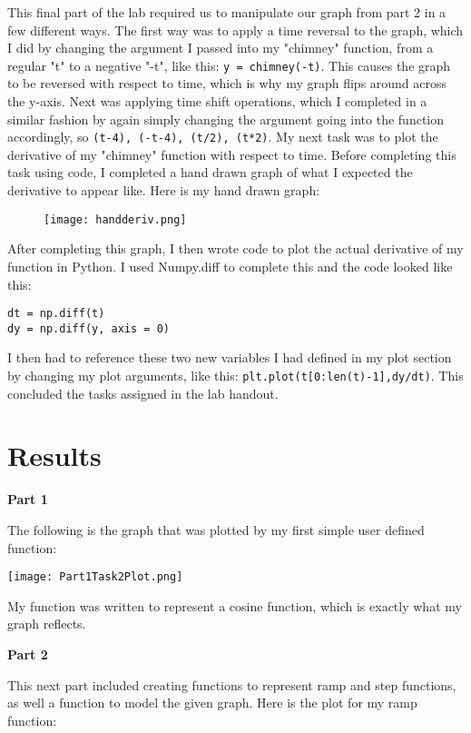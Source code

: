 \documentclass[12pt]{report}
\begin{document}
{This final part of the lab required us to manipulate our graph from part 2 in a few different ways. The first way was to apply a time reversal to the graph, which I did by changing the argument I passed into my "chimney" function, from a regular "t" to a negative "-t", like this: \texttt{y = chimney(-t)}. This causes the graph to be reversed with respect to time, which is why my graph flips around across the y-axis. Next was applying time shift operations, which I completed in a similar fashion by again simply changing the argument going into the function accordingly, so \texttt{(t-4), (-t-4), (t/2), (t*2)}. My next task was to plot the derivative of my "chimney" function with respect to time. Before completing this task using code, I completed a hand drawn graph of what I expected the derivative to appear like. Here is my hand drawn graph:
\begin{figure}[H]
    \centering
    \texttt{[image: handderiv.png]}
\end{figure}
\noindent After completing this graph, I then wrote code to plot the actual derivative of my function in Python. I used Numpy.diff to complete this and the code looked like this: 
\begin{lstlisting}
dt = np.diff(t)
dy = np.diff(y, axis = 0)
\end{lstlisting}
I then had to reference these two new variables I had defined in my plot section by changing my plot arguments, like this: \texttt{plt.plot(t[0:len(t)-1],dy/dt)}. This concluded the tasks assigned in the lab handout.

\newpage
\section{Results} 
\textbf{Part 1}

The following is the graph that was plotted by my first simple user defined function:

    \texttt{[image: Part1Task2Plot.png]}

\noindent My function was written to represent a cosine function, which is exactly what my graph reflects. \newline

\noindent \textbf{Part 2}

This next part included creating functions to represent ramp and step functions, as well a function to model the given graph. Here is the plot for my ramp function:

}
\end{document}
